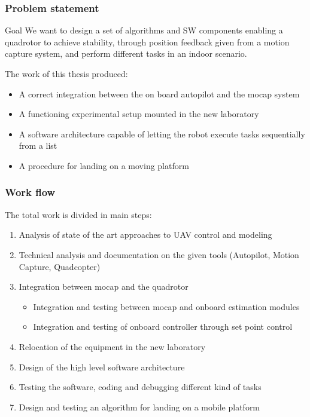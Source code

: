 \documentclass[xcolor=dvipsnames]{beamer}
\begin{document}

\begin{frame}
\frametitle{Problem statement}
\begin{block}{Goal}
We want to design a set of algorithms and SW components enabling a quadrotor
to achieve stability, through position feedback given from a motion capture system,
and perform different tasks in an indoor scenario.
\end{block} 
The work of this thesis produced:
\begin{itemize}
\item A correct integration between the on board autopilot and the mocap system
\item A functioning experimental setup mounted in the new laboratory
\item A software architecture capable of letting the robot execute tasks sequentially from a list
\item A procedure for landing on a moving platform
\end{itemize}
\end{frame}

\begin{frame}
\frametitle{Work flow}

The total work is divided in main steps:
\begin{enumerate}

\item Analysis of state of the art approaches to UAV control and modeling

\item Technical analysis and documentation on the given tools (Autopilot, Motion Capture, Quadcopter)

\item Integration between mocap and the quadrotor
\begin{itemize}

\item Integration and testing between mocap and onboard estimation modules
\item Integration and testing of onboard controller through set point control

\end{itemize}
\item Relocation of the equipment in the new laboratory
\item Design of the high level software architecture 
\item Testing the software, coding and debugging different kind of tasks
\item Design and testing an algorithm for landing on a mobile platform

\end{enumerate}
\end{frame}
\end{document}
